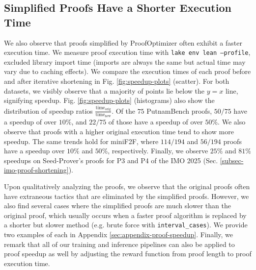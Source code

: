 \subsection{Simplified Proofs Have a Shorter Execution Time}\label{subsec:proof-execution-time}
We also observe that proofs simplified by ProofOptimizer often exhibit a faster execution time. We measure proof execution time with \texttt{lake env lean --profile}, excluded library import time (imports are always the same but actual time may vary due to caching effects). We compare the execution times of each proof before and after iterative shortening in Fig. \ref{fig:speedup-plots} (scatter). For both datasets, we visibly observe that a majority of points lie below the $y=x$ line, signifying speedup. Fig. \ref{fig:speedup-plots} (histograms) also show the distribution of speedup ratios $\frac{\text{time}_\text{orig}}{\text{time}_\text{new}}$. Of the $75$ PutnamBench proofs, $50/75$ have a speedup of over $10\%$, and $22/75$ of those have a speedup of over $50\%$. We also observe that proofs with a higher original execution time tend to show more speedup. The same trends hold for miniF2F, where $114/194$ and $56/194$ proofs have a speedup over $10\%$ and $50\%$, respectively. Finally, we observe $25\%$ and $81\%$ speedups on Seed-Prover's proofs for P3 and P4 of the IMO 2025 (Sec. \ref{subsec-imo-proof-shortening}).

Upon qualitatively analyzing the proofs, we observe that the original proofs often have extraneous tactics that are eliminated by the simplified proofs. However, we also find several cases where the simplified proofs are much slower than the original proof, which usually occurs when a faster proof algorithm is replaced by a shorter but slower method (e.g. brute force with \texttt{interval\_cases}). We provide two examples of each in Appendix \ref{sec:appendix-proof-speedup}. Finally, we remark that all of our training and inference pipelines can also be applied to proof speedup as well by adjusting the reward function from proof length to proof execution time. 

